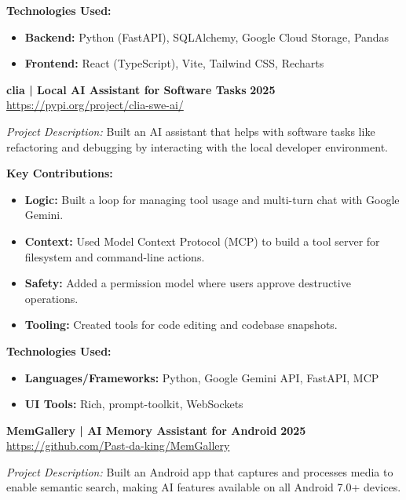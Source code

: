 \documentclass[a4paper,10pt]{article}
\begin{document}
\vspace{8pt}
\textbf{Technologies Used:}
\begin{itemize}
    \item \textbf{Backend:} Python (FastAPI), SQLAlchemy, Google Cloud Storage, Pandas
    \item \textbf{Frontend:} React (TypeScript), Vite, Tailwind CSS, Recharts
\end{itemize}

\vspace{8pt}

\textbf{clia | Local AI Assistant for Software Tasks} \hfill \textbf{2025}\\
\small\url{https://pypi.org/project/clia-swe-ai/}

\textit{Project Description:} 
Built an AI assistant that helps with software tasks like refactoring and debugging by interacting with the local developer environment.

\textbf{Key Contributions:}
\begin{itemize}
    \item \textbf{Logic:} Built a loop for managing tool usage and multi-turn chat with Google Gemini.
    \item \textbf{Context:} Used Model Context Protocol (MCP) to build a tool server for filesystem and command-line actions.
    \item \textbf{Safety:} Added a permission model where users approve destructive operations.
    \item \textbf{Tooling:} Created tools for code editing and codebase snapshots.
\end{itemize}

\textbf{Technologies Used:}
\begin{itemize}
    \item \textbf{Languages/Frameworks:} Python, Google Gemini API, FastAPI, MCP
    \item \textbf{UI Tools:} Rich, prompt-toolkit, WebSockets
\end{itemize}

\vspace{8pt}

\textbf{MemGallery | AI Memory Assistant for Android} \hfill \textbf{2025}\\
\small\url{https://github.com/Past-da-king/MemGallery}

\textit{Project Description:} 
Built an Android app that captures and processes media to enable semantic search, making AI features available on all Android 7.0+ devices.
\end{document}
